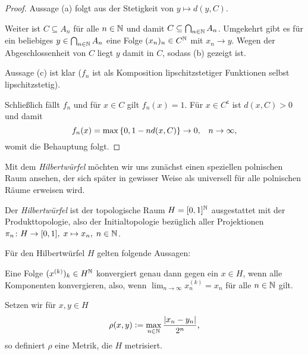\documentclass[../main/main.tex]{subfiles}
\begin{document}
	\begin{proof}
		Aussage (a) folgt aus der Stetigkeit von $y \mapsto d(y, C)$.
		
		Weiter ist $C \subseteq A_n$ für alle $n \in \mathbb{N}$ und damit 
		$C \subseteq \bigcap_{n \in \mathbb{N}} A_n$. 
		Umgekehrt gibt es für ein beliebiges $y \in \bigcap_{n \in \mathbb{N}} A_n$
		eine Folge $(x_n)_n \in C^{\mathbb{N}}$ mit $x_n \rightarrow y$. 
		Wegen der Abgeschlossenheit von $C$ liegt $y$ damit in $C$, sodass (b) gezeigt ist.
		
		Aussage (c) ist klar ($f_n$ ist als Komposition 
		lipschitzstetiger Funktionen selbst lipschitzstetig).
		
		Schließlich fällt $f_n$ und für $x \in C$ gilt $f_n(x) = 1$. 
		Für $x \in C^\mathsf{c}$ ist $d(x, C) > 0$ und damit
		$$f_n(x) = \max \left\{0, 1-n d(x, C)\right\} 
		\to 0 \text{,} \quad n \to \infty \text{,}$$
		womit die Behauptung folgt.
	\end{proof}
	
	Mit dem \emph{Hilbertwürfel} möchten wir uns zunächst einen speziellen polnischen Raum ansehen, 
	der sich später in gewisser Weise als universell für alle polnischen Räume erweisen wird.
	
	\begin{Definition}[Hilbertwürfel]
		Der \emph{Hilbertwürfel} ist der topologische Raum $H = [0, 1]^{\mathbb{N}}$ 
		ausgestattet mit der Produkttopologie, also der Initialtopologie bezüglich 
		aller Projektionen $\pi_n \colon H \to [0, 1], \; x \mapsto x_n , \; n \in \mathbb{N}$.
	\end{Definition}
	
	\begin{Hilfssatz}
		\label{lem:hilbertcube}
		Für den Hilbertwürfel $H$ gelten folgende Aussagen:
		\begin{enumeratethm}
			\item Eine Folge $(x^{(k)})_k \in H^{\mathbb{N}}$ konvergiert genau dann gegen 
			ein $x \in H$, wenn alle Komponenten konvergieren, also, wenn
			$\lim_{n \to \infty} x_n^{(k)} = x_n$ für alle $n \in \mathbb{N}$ gilt.
			\item Setzen wir für $x, y \in H$
			$$\rho(x, y) \vcentcolon = \max_{n \in \mathbb{N}} \frac{|x_n - y_n|}{2^n} \text{,}$$
			so definiert $\rho$ eine Metrik, die $H$ metrisiert.
		\end{enumeratethm}
	\end{Hilfssatz}
	
\end{document}
